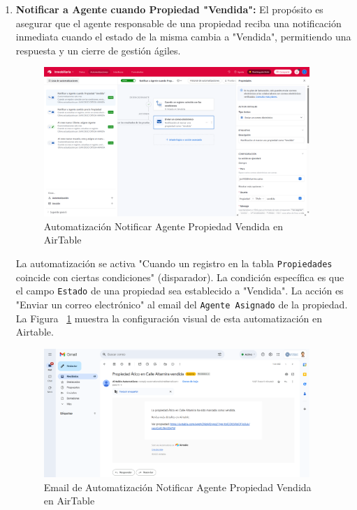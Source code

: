 \begin{enumerate}

    \item \textbf{Notificar a Agente cuando Propiedad "Vendida":} El propósito es asegurar que el agente responsable de una propiedad reciba una notificación inmediata cuando el estado de la misma cambia a "Vendida", permitiendo una respuesta y un cierre de gestión ágiles.

    \begin{figure}[H]
        \begin{center}
            \includegraphics[width = 0.95\textwidth]{Figuras/automatizacionnotificaragentepropiedadvendida.png}
        \end{center}
        \caption{\label{fig:automatizacionnotificaragentepropiedadvendida} Automatización Notificar Agente Propiedad Vendida en AirTable}
    \end{figure}

    La automatización se activa "Cuando un registro en la tabla \texttt{Propiedades} coincide con ciertas condiciones" (disparador). La condición específica es que el campo \texttt{Estado} de una propiedad sea establecido a "Vendida". La acción es "Enviar un correo electrónico" al email del \texttt{Agente Asignado} de la propiedad. La Figura ~\ref{fig:automatizacionnotificaragentepropiedadvendida} muestra la configuración visual de esta automatización en Airtable.

    \begin{figure}[H]
        \begin{center}
            \includegraphics[width = 0.95\textwidth]{Figuras/emailautomatizacionnotificaragentepropiedadvendida.png}
        \end{center}
        \caption{\label{fig:emailautomatizacionnotificaragentepropiedadvendida} Email de Automatización Notificar Agente Propiedad Vendida en AirTable}
    \end{figure}


\end{enumerate}
